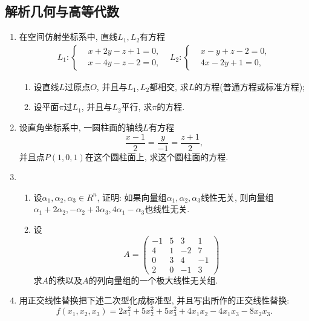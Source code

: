 \documentclass[12pt,a4paper,openany]{book}
\begin{document}
\subsection{解析几何与高等代数}
\begin{enumerate}
\item 在空间仿射坐标系中, 直线$L_1, L_2$有方程
\[
\begin{array}{cc}
L_1: \left\{
\begin{aligned}
&x + 2y - z + 1 = 0, \\
&x - 4y - z - 2 = 0,
\end{aligned}
\right. 
&
L_2: \left\{
\begin{aligned}
&x - y + z - 2 = 0, \\
&4x - 2y + 1 = 0,
\end{aligned}
\right.
\end{array}
\]
\begin{enumerate}
\item 设直线$L$过原点$O$, 并且与$L_1, L_2$都相交, 求$L$的方程(普通方程或标准方程);
\item 设平面$\pi$过$L_1$, 并且与$L_2$平行, 求$\pi$的方程.
\end{enumerate}

\item 设直角坐标系中, 一圆柱面的轴线$L$有方程
\[
\frac{x-1}{2} = \frac{y}{-1} = \frac{z+1}{2},
\]
并且点$P(1, 0, 1)$在这个圆柱面上, 求这个圆柱面的方程.

\item \begin{enumerate}
\item 设$\alpha_1, \alpha_2, \alpha_3 \in R^n$, 证明: 如果向量组$\alpha_1, \alpha_2, \alpha_3$线性无关, 则向量组$\alpha_1+2\alpha_2, -\alpha_2+3\alpha_3, 4\alpha_1-\alpha_3$也线性无关.

\item 设
\[
A = \begin{pmatrix}
-1 & 5 & 3 & 1 \\
4 & 1 & -2 & 7 \\
0 & 3 & 4 & -1 \\
2 & 0 & -1 & 3
\end{pmatrix}
\]
求$A$的秩以及$A$的列向量组的一个极大线性无关组.
\end{enumerate}

\item 用正交线性替换把下述二次型化成标准型, 并且写出所作的正交线性替换:
\[
f(x_1, x_2, x_3) = 2x_1^2 + 5x_2^2 + 5x_3^2 +4x_1x_2 - 4x_1x_3 - 8x_2x_3.
\]


\end{enumerate}
\end{document}
